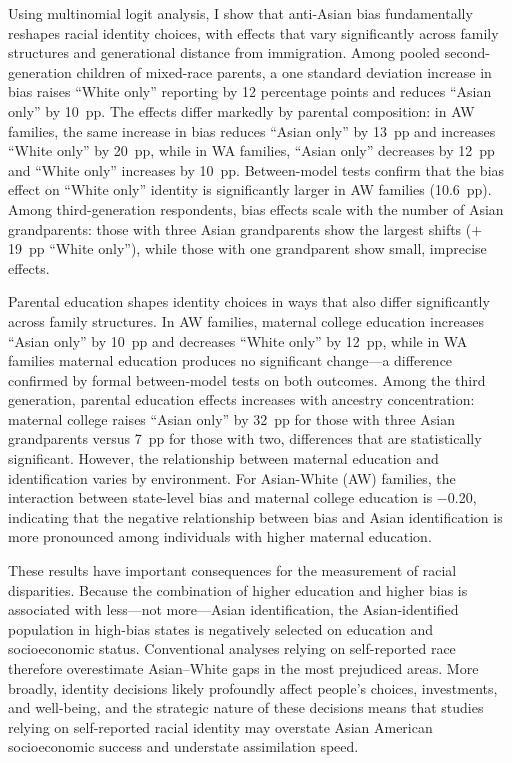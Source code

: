 Using multinomial logit analysis, I show that anti-Asian bias fundamentally reshapes racial identity choices, with effects that vary significantly across family structures and generational distance from immigration. Among pooled second-generation children of mixed-race parents, a one standard deviation increase in bias raises ``White only'' reporting by 12 percentage points and reduces ``Asian only'' by 10~pp. The effects differ markedly by parental composition: in AW families, the same increase in bias reduces ``Asian only'' by 13~pp and increases ``White only'' by 20~pp, while in WA families, ``Asian only'' decreases by 12~pp and ``White only'' increases by 10~pp. Between-model tests confirm that the bias effect on ``White only'' identity is significantly larger in AW families (10.6~pp). Among third-generation respondents, bias effects scale with the number of Asian grandparents: those with three Asian grandparents show the largest shifts ($+$19~pp ``White only''), while those with one grandparent show small, imprecise effects. 
 
Parental education shapes identity choices in ways that also differ significantly across family structures. In AW families, maternal college education increases ``Asian only'' by 10~pp and decreases ``White only'' by 12~pp, while in WA families maternal education produces no significant change---a difference confirmed by formal between-model tests on both outcomes. Among the third generation, parental education effects increases with ancestry concentration: maternal college raises ``Asian only'' by 32~pp for those with three Asian grandparents versus 7~pp for those with two, differences that are statistically significant. However, the relationship between maternal education and identification varies by environment. For Asian-White (AW) families, the interaction between state-level bias and maternal college education is $-$0.20, indicating that the negative relationship between bias and Asian identification is more pronounced among individuals with higher maternal education.
 
These results have important consequences for the measurement of racial disparities. Because the combination of higher education and higher bias is associated with less---not more---Asian identification, the Asian-identified population in high-bias states is negatively selected on education and socioeconomic status. Conventional analyses relying on self-reported race therefore overestimate Asian--White gaps in the most prejudiced areas. More broadly, identity decisions likely profoundly affect people's choices, investments, and well-being, and the strategic nature of these decisions means that studies relying on self-reported racial identity may overstate Asian American socioeconomic success and understate assimilation speed.
 
